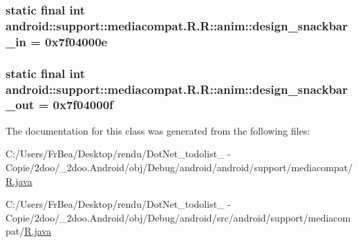 \hypertarget{classandroid_1_1support_1_1mediacompat_1_1_r_1_1anim_b65d6320e8025e8fadca8b047a98d5f4}{
\subsubsection[{design\_\-snackbar\_\-in}]{\setlength{\rightskip}{0pt plus 5cm}static final int android::support::mediacompat.R.R::anim::design\_\-snackbar\_\-in = 0x7f04000e}}
\label{classandroid_1_1support_1_1mediacompat_1_1_r_1_1anim_b65d6320e8025e8fadca8b047a98d5f4}


\hypertarget{classandroid_1_1support_1_1mediacompat_1_1_r_1_1anim_65ff6dae027852c234db79ad5e802eb9}{
\subsubsection[{design\_\-snackbar\_\-out}]{\setlength{\rightskip}{0pt plus 5cm}static final int android::support::mediacompat.R.R::anim::design\_\-snackbar\_\-out = 0x7f04000f}}
\label{classandroid_1_1support_1_1mediacompat_1_1_r_1_1anim_65ff6dae027852c234db79ad5e802eb9}




The documentation for this class was generated from the following files:\begin{CompactItemize}
\item 
C:/Users/FrBea/Desktop/rendu/DotNet\_\-todolist\_ - Copie/2doo/\_\-2doo.Android/obj/Debug/android/android/support/mediacompat/\hyperlink{android_2support_2mediacompat_2_r_8java}{R.java}\item 
C:/Users/FrBea/Desktop/rendu/DotNet\_\-todolist\_ - Copie/2doo/\_\-2doo.Android/obj/Debug/android/src/android/support/mediacompat/\hyperlink{src_2android_2support_2mediacompat_2_r_8java}{R.java}\end{CompactItemize}
